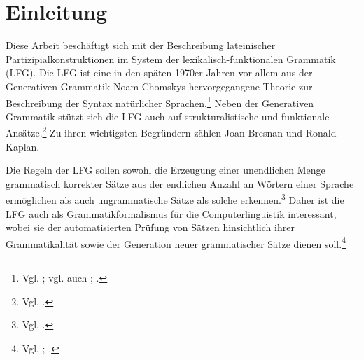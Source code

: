 \documentclass[12pt,a4paper]{article}
\begin{document}

\begingroup
\flushbottom
\begin{spacing}{1.25}
\tableofcontents
\end{spacing}
\thispagestyle{empty}
\pagebreak
\endgroup
\setcounter{page}{1}

\nocite{Menge}
\nocite{LHS}
\nocite{KSt}
\nocite{Rohrer}
\nocite{Skript}
\nocite{Dal}
\nocite{Falk}
\nocite{Bresnan}
\nocite{Snijders}
\nocite{DAZ}



\section{Einleitung}
Diese Arbeit beschäftigt sich mit der Beschreibung lateinischer Partizipialkonstruktionen im System der lexikalisch-funktionalen Grammatik (LFG). Die LFG ist eine in den späten 1970er Jahren vor allem aus der Generativen Grammatik Noam Chomskys hervorgegangene Theorie zur Beschreibung der Syntax natürlicher Sprachen.\footnote{Vgl. \cite[4]{Skript}; vgl. auch \cite[1]{Dal}; \cite[3]{Bresnan}.} Neben der Generativen Grammatik stützt sich die LFG auch auf strukturalistische und funktionale Ansätze.\footnote{Vgl. \cite[3]{Bresnan}.} Zu ihren wichtigsten Begründern zählen Joan Bresnan und Ronald Kaplan.

Die Regeln der LFG sollen sowohl die Erzeugung einer unendlichen Menge grammatisch korrekter Sätze aus der endlichen Anzahl an Wörtern einer Sprache ermöglichen als auch ungrammatische Sätze als solche erkennen.\footnote{Vgl. \cite[18]{Skript}.} Daher ist die LFG auch als Grammatikformalismus für die Computerlinguistik interessant, wobei sie der automatisierten Prüfung von Sätzen hinsichtlich ihrer Grammatikalität sowie der Generation neuer grammatischer Sätze dienen soll.\footnote{Vgl. \cite[18]{Skript}; \cite[vii]{Bresnan}.}
 
\end{document}
